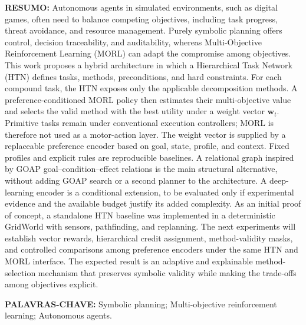 \documentclass[ppgc,pep,english,brazilian]{infufrgs}
\begin{document}
\fontsize{12}{14.4}\selectfont
\singlespacing
\justifying

\noindent
\textbf{RESUMO:}
Autonomous agents in simulated environments, such as digital games, often need to
balance competing objectives, including task progress, threat avoidance, and
resource management.
Purely symbolic planning offers control, decision traceability, and auditability, whereas
Multi-Objective Reinforcement Learning (MORL) can adapt the compromise among
objectives.
This work proposes a hybrid architecture in which a Hierarchical Task Network (HTN)
defines tasks, methods, preconditions, and hard constraints.
For each compound task, the HTN exposes only the applicable decomposition methods.
%
A preference-conditioned MORL policy then estimates their multi-objective value
and selects the valid method with the best utility under a weight vector
$\mathbf{w}_t$.
Primitive tasks remain under conventional execution controllers; MORL is therefore
not used as a motor-action layer.
%
The weight vector is supplied by a replaceable preference encoder based on goal,
state, profile, and context.
Fixed profiles and explicit rules are reproducible baselines.
A relational graph inspired by GOAP goal--condition--effect relations is the main
structural alternative, without adding GOAP search or a second planner to the
architecture.
A deep-learning encoder is a conditional extension, to be evaluated only if
experimental evidence and the available budget justify its added complexity.
%
As an initial proof of concept, a standalone HTN baseline was implemented in a
deterministic GridWorld with sensors, pathfinding, and replanning.
The next experiments will establish vector rewards, hierarchical credit
assignment, method-validity masks, and controlled comparisons among preference
encoders under the same HTN and MORL interface.
The expected result is an adaptive and explainable method-selection mechanism
that preserves symbolic validity while making the trade-offs among objectives
explicit.

\medskip

\noindent
\textbf{PALAVRAS-CHAVE:}
Symbolic planning; Multi-objective reinforcement learning; Autonomous agents.
\end{document}
